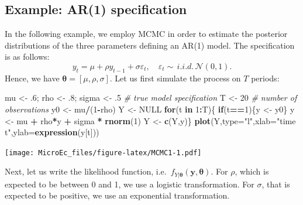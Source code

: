 \documentclass[
  12pt,
]{book}
\newenvironment{Shaded}{\begin{snugshade}}{\end{snugshade}}
\newcommand{\AttributeTok}[1]{\textcolor[rgb]{0.13,0.29,0.53}{#1}}
\newcommand{\CommentTok}[1]{\textcolor[rgb]{0.56,0.35,0.01}{\textit{#1}}}
\newcommand{\ConstantTok}[1]{\textcolor[rgb]{0.56,0.35,0.01}{#1}}
\newcommand{\ControlFlowTok}[1]{\textcolor[rgb]{0.13,0.29,0.53}{\textbf{#1}}}
\newcommand{\DecValTok}[1]{\textcolor[rgb]{0.00,0.00,0.81}{#1}}
\newcommand{\FunctionTok}[1]{\textcolor[rgb]{0.13,0.29,0.53}{\textbf{#1}}}
\newcommand{\NormalTok}[1]{#1}
\newcommand{\OtherTok}[1]{\textcolor[rgb]{0.56,0.35,0.01}{#1}}
\newcommand{\SpecialCharTok}[1]{\textcolor[rgb]{0.81,0.36,0.00}{\textbf{#1}}}
\newcommand{\StringTok}[1]{\textcolor[rgb]{0.31,0.60,0.02}{#1}}
\theoremstyle{definition}
\theoremstyle{definition}
\theoremstyle{definition}
\theoremstyle{definition}
\theoremstyle{remark}
\begin{document}
\hypertarget{example-ar1-specification}{%
\subsection{Example: AR(1) specification}\label{example-ar1-specification}}

In the following example, we employ MCMC in order to estimate the posterior distributions of the three parameters defining an AR(1) model. The specification is as follows:
\[
y_t = \mu + \rho y_{t-1} + \sigma \varepsilon_{t}, \quad \varepsilon_t \sim \,i.i.d.\,\mathcal{N}(0,1).
\]
Hence, we have \({\boldsymbol\theta} = [\mu,\rho,\sigma]\). Let us first simulate the process on \(T\) periods:

\begin{Shaded}
\begin{Highlighting}[]
\NormalTok{mu }\OtherTok{\textless{}{-}}\NormalTok{ .}\DecValTok{6}\NormalTok{; rho }\OtherTok{\textless{}{-}}\NormalTok{ .}\DecValTok{8}\NormalTok{; sigma }\OtherTok{\textless{}{-}}\NormalTok{ .}\DecValTok{5} \CommentTok{\# true model specification}
\NormalTok{T }\OtherTok{\textless{}{-}} \DecValTok{20} \CommentTok{\# number of observations}
\NormalTok{y0 }\OtherTok{\textless{}{-}}\NormalTok{ mu}\SpecialCharTok{/}\NormalTok{(}\DecValTok{1}\SpecialCharTok{{-}}\NormalTok{rho)}
\NormalTok{Y }\OtherTok{\textless{}{-}} \ConstantTok{NULL}
\ControlFlowTok{for}\NormalTok{(t }\ControlFlowTok{in} \DecValTok{1}\SpecialCharTok{:}\NormalTok{T)\{}
  \ControlFlowTok{if}\NormalTok{(t}\SpecialCharTok{==}\DecValTok{1}\NormalTok{)\{y }\OtherTok{\textless{}{-}}\NormalTok{ y0\}}
\NormalTok{  y }\OtherTok{\textless{}{-}}\NormalTok{ mu }\SpecialCharTok{+}\NormalTok{ rho}\SpecialCharTok{*}\NormalTok{y }\SpecialCharTok{+}\NormalTok{ sigma }\SpecialCharTok{*} \FunctionTok{rnorm}\NormalTok{(}\DecValTok{1}\NormalTok{)}
\NormalTok{  Y }\OtherTok{\textless{}{-}} \FunctionTok{c}\NormalTok{(Y,y)\}}
\FunctionTok{plot}\NormalTok{(Y,}\AttributeTok{type=}\StringTok{"l"}\NormalTok{,}\AttributeTok{xlab=}\StringTok{"time t"}\NormalTok{,}\AttributeTok{ylab=}\FunctionTok{expression}\NormalTok{(y[t]))}
\end{Highlighting}
\end{Shaded}

\texttt{[image: MicroEc\_files/figure-latex/MCMC1-1.pdf]}

Next, let us write the likelihood function, i.e.~\(f_{Y|{\boldsymbol\theta}}(\mathbf{y},{\boldsymbol\theta})\). For \(\rho\), which is expected to be between 0 and 1, we use a logistic transformation. For \(\sigma\), that is expected to be positive, we use an exponential transformation.
\end{document}
